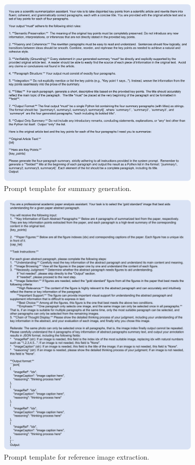 
\begin{figure}[t]
\centering
\includegraphics[width=0.9\textwidth]{figs/prompt_2}
\caption{Prompt template for summary generation.}
\label{fig:prompt2}
\end{figure}

\begin{figure}[t]
\centering
\includegraphics[width=0.9\textwidth]{figs/prompt_3}
\caption{Prompt template for reference image extraction.}
\label{fig:prompt3}
\end{figure}

